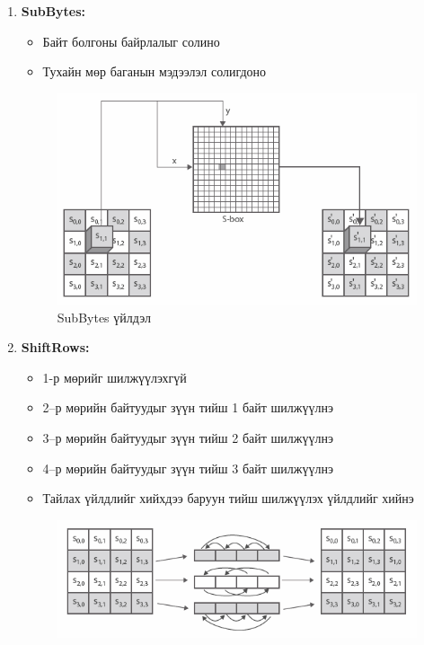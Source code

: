 \begin{enumerate}
	\item \textbf{SubBytes:} 
	\begin{itemize}
		\item Байт болгоны байрлалыг солино
		\item Тухайн мөр баганын мэдээлэл солигдоно
	\end{itemize}
	\begin{figure}[h]
		\centering
		\includegraphics[scale=0.65]{assets/subbytes.png}
		\caption{SubBytes үйлдэл}
		\label{fig:subbytes}
	\end{figure}
	\item \textbf{ShiftRows:}
	\begin{itemize}
		\item 1-р мөрийг шилжүүлэхгүй
		\item 2–р мөрийн байтуудыг зүүн тийш 1 байт шилжүүлнэ
		\item 3–р мөрийн байтуудыг зүүн тийш 2 байт шилжүүлнэ
		\item 4–р мөрийн байтуудыг зүүн тийш 3 байт шилжүүлнэ
		\item Тайлах үйлдлийг хийхдээ баруун тийш шилжүүлэх үйлдлийг хийнэ
	\end{itemize}
	\begin{figure}[h]
		\centering
		\includegraphics[scale=0.6]{assets/shiftrows.png}

\end{figure}
\end{enumerate}
